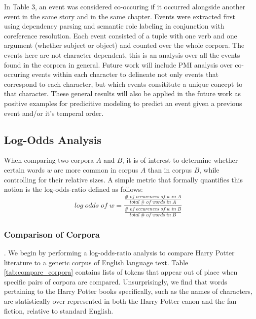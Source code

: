  In Table 3, an event was considered co-occuring if it occurred alongside another event in the same story and in the same chapter.  Events were extracted first using dependency parsing and semantic role labeling in conjunction with coreference resolution.  Each event consisted of a tuple with one verb and one argument (whether subject or object) and counted over the whole corpora.  The events here are not character dependent, this is an analysis over all the events found in the corpora in general.  Future work will include PMI analysis over co-occuring events within each character to delineate not only events that correspond to each character, but which events consititute a unique concept to that character.  These general results will also be applied in the future work as positive examples for predicitive modeling to predict an event given a previous event and/or it's temperal order.
 
 \subsection{Log-Odds Analysis}
 When comparing two corpora $A$ and $B$, it is of interest to determine whether certain words $w$ are more common in corpus $A$ than in corpus $B$, while controlling for their relative sizes. A simple metric that formally quantifies this notion is the log-odds-ratio defined as follows:
$$log \; odds \; of \; w = \frac{\frac{\# \; of \; occurences \; of \; w \; in \; A}{total \; \# \; of \; words \; in \; A}}{\frac{\# \; of \; occurences \; of \; w \; in \; B}{total \; \# \; of \; words \; in \; B}}$$

\subsubsection{Comparison of Corpora}. \label{corpus_level_odds}
We begin by performing a log-odds-ratio analysis to compare Harry Potter literature to a generic corpus of English language text. Table \ref{tab:compare_corpora} contains lists of tokens that appear out of place when specific pairs of corpora are compared. Unsurprisingly, we find that words pertaining to the Harry Potter books specifically, such as the names of characters, are statistically over-represented in both the Harry Potter canon and the fan fiction, relative to standard English. 

\begin{table}[htbp]
\centering
{}
\caption{}
\label{tab:compare_corpora}
\end{table}

